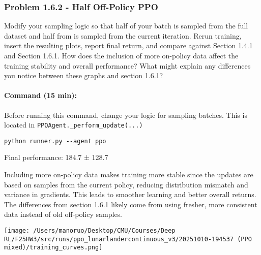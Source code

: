 \documentclass[12pt]{article}
\begin{document}
\subsubsection*{Problem 1.6.2 - Half Off-Policy PPO}
Modify your sampling logic so that half of your batch is sampled from the full dataset and half from is sampled from the current iteration.  Rerun training, insert the resulting plots, report final return, and compare against Section 1.4.1 and Section 1.6.1. How does the inclusion of more on-policy data affect the training stability and overall performance?  What might explain any differences you notice between these graphs and section 1.6.1?

\paragraph{Command (15 min):} Before running this command, change your logic for sampling batches.  This is located in \texttt{PPOAgent.\_perform\_update(...)}
\begin{verbatim}
python runner.py --agent ppo
\end{verbatim}

\begin{solution}[height=10cm]
Final performance: 184.7 ± 128.7

Including more on-policy data makes training more stable since the updates are based on samples from the current policy, 
reducing distribution mismatch and variance in gradients. 
This leads to smoother learning and better overall returns. 
The differences from section 1.6.1 likely come from using fresher, more consistent data instead of old off-policy samples.

\centering
    \texttt{[image: /Users/manoruo/Desktop/CMU/Courses/Deep RL/F25HW3/src/runs/ppo\_lunarlandercontinuous\_v3/20251010-194537 (PPO mixed)/training\_curves.png]}
    \label{fig:ppo_mixed}
\end{solution}



\end{document}
